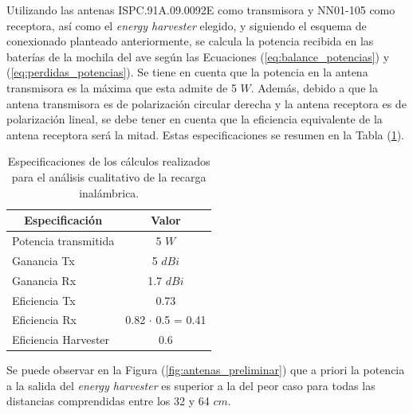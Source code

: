 Utilizando las antenas ISPC.91A.09.0092E como transmisora y NN01-105 como receptora, así como el \textit{energy harvester} elegido, y siguiendo el esquema de conexionado planteado anteriormente, se calcula la potencia recibida en las baterías de la mochila del ave según las Ecuaciones (\ref{eq:balance_potencias}) y (\ref{eq:perdidas_potencias}). Se tiene en cuenta que la potencia en la antena transmisora es la máxima que esta admite de 5 $W$.%
Además, debido a que la antena transmisora es de polarización circular derecha y la antena receptora es de polarización lineal, se debe tener en cuenta que la eficiencia equivalente de la antena receptora será la mitad. Estas especificaciones se resumen en la Tabla (\ref{tab:antenas_calc}).

\begin{table}[H]
\centering
\begin{tabular}{|l|c|}
\hline
\multicolumn{1}{|c|}{Especificación} & Valor            \\ \hline
Potencia transmitida                 & 5 $W$           \\ \hline
Ganancia Tx                          & 5 $dBi$          \\ \hline
Ganancia Rx                          & 1.7 $dBi$      \\ \hline
Eficiencia Tx                        & 0.73             \\ \hline
Eficiencia Rx                        & 0.82 $\cdot$ 0.5 = 0.41 \\ \hline
Eficiencia Harvester                 & 0.6              \\ \hline
\end{tabular}
\caption{Especificaciones de los cálculos realizados para el análisis cualitativo de la recarga inalámbrica.}
\label{tab:antenas_calc}
\end{table}

Se puede observar en la Figura (\ref{fig:antenas_preliminar}) que a priori la potencia a la salida del \textit{energy harvester} es superior a la del peor caso para todas las distancias comprendidas entre los 32 y 64 $cm$. 

